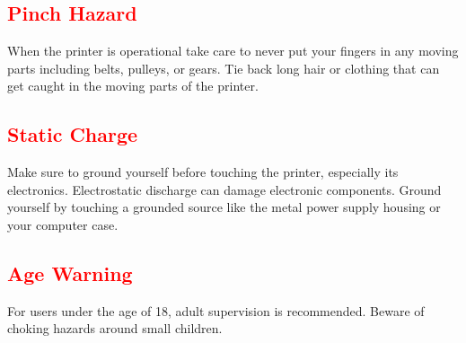 \subsection{\textcolor{red}{Pinch Hazard}}

When the printer is operational take care to never put your fingers in any moving parts including belts, pulleys, or gears. Tie back long hair or clothing that can get caught in the moving parts of the printer.

\subsection{\textcolor{red}{Static Charge}}
Make sure to ground yourself before touching the printer, especially its electronics. Electrostatic discharge can damage electronic components. Ground yourself by touching a grounded source like the metal power supply housing or your computer case.

\subsection{\textcolor{red}{Age Warning}}

For users under the age of 18, adult supervision is recommended. Beware of choking hazards around small children.

